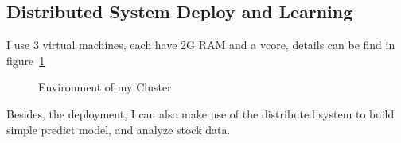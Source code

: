 \documentclass[12pt,a4paper]{scrartcl}
\begin{document}
	\subsection{Distributed System Deploy and Learning}
	I use 3 virtual machines, each have 2G RAM and a vcore, details can be find in figure~\ref{fig:environment}
	\begin{figure}[ht]
		\centering
		\caption{Environment of my Cluster}
		\label{fig:environment}
	\end{figure} 
	Besides, the deployment, I can also make use of the distributed system to build simple predict model, and analyze stock data.
\end{document}
